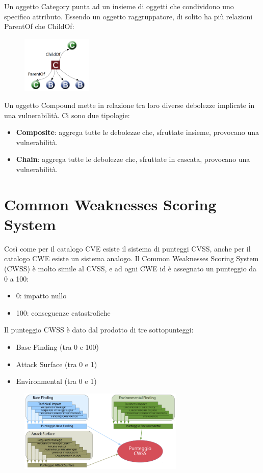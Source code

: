Un oggetto Category punta ad un insieme di oggetti
che condividono uno specifico attributo. Essendo un oggetto raggruppatore, di solito ha più
relazioni ParentOf che ChildOf:

\begin{figure}[hbpt!]
    \centering
    \includegraphics[width=0.3\textwidth]{./Images/cap3/3.2.png}
\end{figure}
\FloatBarrier

Un oggetto Compound mette in relazione tra loro
diverse debolezze implicate in una vulnerabilità. Ci sono due tipologie:
\begin{itemize}
    \item \textbf{Composite}: aggrega tutte le debolezze che,
sfruttate insieme, provocano
una vulnerabilità.
    \item \textbf{Chain}: aggrega tutte le debolezze che,
sfruttate in cascata, provocano
una vulnerabilità.
\end{itemize}

\section{Common Weaknesses Scoring System}
Così come per il catalogo CVE esiste il sistema di
punteggi CVSS, anche per il catalogo CWE esiste un
sistema analogo. Il Common Weaknesses Scoring System (CWSS)
è molto simile al CVSS, e ad ogni CWE id è assegnato un punteggio da 0 a 100:
\begin{itemize}
    \item 0: impatto nullo
    \item 100: conseguenze catastrofiche 
\end{itemize}
Il punteggio CWSS è dato dal prodotto di tre
sottopunteggi:
\begin{itemize}
    \item Base Finding (tra 0 e 100)
    \item Attack Surface (tra 0 e 1)
    \item Environmental (tra 0 e 1)
\end{itemize}

\begin{figure}[hbpt!]
    \centering
    \includegraphics[width=0.7\textwidth]{./Images/cap3/3.3.png}
\end{figure}
\FloatBarrier

